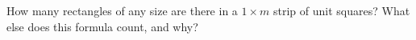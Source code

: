 How many rectangles of any size are there in a $1\times m$ strip of unit squares? What else does this formula count, and why?
